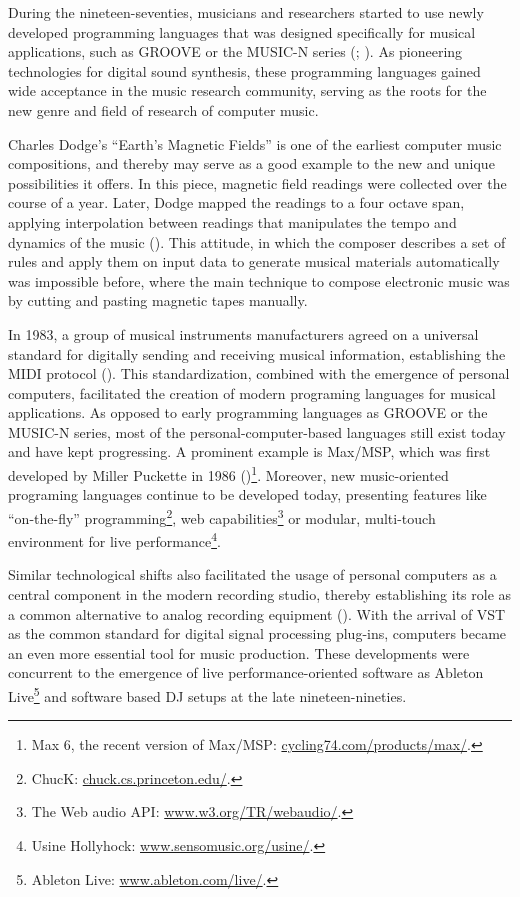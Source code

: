 \documentclass[a4paper,11pt]{article}
\begin{document}
During the nineteen-seventies, musicians and researchers started to use newly developed programming languages that was designed specifically for musical applications, such as GROOVE or the MUSIC-N series (\cite{mathews70}; \cite{mathews69}).
As pioneering technologies for digital sound synthesis, these programming languages gained wide acceptance in the music research community, serving as the roots for the new genre and field of research of computer music.

Charles Dodge's ``Earth's Magnetic Fields'' is one of the earliest computer music compositions, and thereby may serve as a good example to the new and unique possibilities it offers.
In this piece, magnetic field readings were collected over the course of a year.
Later, Dodge mapped the readings to a four octave span, applying interpolation between readings that manipulates the tempo and dynamics of the music (\cite{scriptsgrooves14}).
This attitude, in which the composer describes a set of rules and apply them on input data to generate musical materials automatically was impossible before, where the main technique to compose electronic music was by cutting and pasting magnetic tapes manually.

In 1983, a group of musical instruments manufacturers agreed on a universal standard for digitally sending and receiving musical information, establishing the MIDI protocol (\cite{web:quinn}).
This standardization, combined with the emergence of personal computers, facilitated the creation of modern programing languages for musical applications.
As opposed to early programming languages as GROOVE or the MUSIC-N series, most of the personal-computer-based languages still exist today and have kept progressing.
A prominent example is Max/MSP, which was first developed by Miller Puckette in 1986 (\cite[p. 16]{winkler01})\footnote{Max 6, the recent version of Max/MSP: \href{http://cycling74.com/products/max/}{cycling74.com/products/max/}.}.
Moreover, new music-oriented programing languages continue to be developed today, presenting features like ``on-the-fly'' programming\footnote{ChucK: \href{http://chuck.cs.princeton.edu/}{chuck.cs.princeton.edu/}.}, web capabilities\footnote{The Web audio API: \href{http://www.w3.org/TR/webaudio/}{www.w3.org/TR/webaudio/}.} or modular, multi-touch environment for live performance\footnote{Usine Hollyhock: \href{http://www.sensomusic.org/usine/}{www.sensomusic.org/usine/}.}.

Similar technological shifts also facilitated the usage of personal computers as a central component in the modern recording studio, thereby establishing its role as a common alternative to analog recording equipment (\cite{leider:04}).
With the arrival of VST as the common standard for digital signal processing plug-ins, computers became an even more essential tool for music production.
These developments were concurrent to the emergence of live performance-oriented software as Ableton Live\footnote{Ableton Live: \href{http://www.ableton.com/en/live/}{www.ableton.com/live/}.} and software based DJ setups at the late nineteen-nineties.
\end{document}
